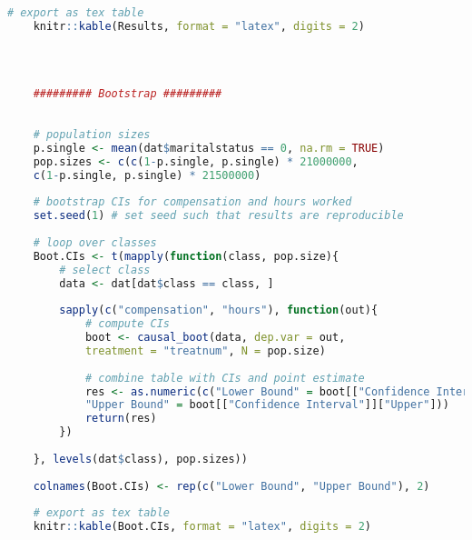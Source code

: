 \documentclass[aodsor,preprint]{imsart}
\numberwithin{equation}{section}
\theoremstyle{plain}
\begin{document}
\begin{lstlisting}[language=R, basicstyle=\tiny]
	# export as tex table
	knitr::kable(Results, format = "latex", digits = 2)
	
	
	
	
	######### Bootstrap #########
	
	
	# population sizes
	p.single <- mean(dat$maritalstatus == 0, na.rm = TRUE)
	pop.sizes <- c(c(1-p.single, p.single) * 21000000,
	c(1-p.single, p.single) * 21500000)
	
	# bootstrap CIs for compensation and hours worked
	set.seed(1) # set seed such that results are reproducible
	
	# loop over classes
	Boot.CIs <- t(mapply(function(class, pop.size){
		# select class
		data <- dat[dat$class == class, ]
		
		sapply(c("compensation", "hours"), function(out){
			# compute CIs
			boot <- causal_boot(data, dep.var = out,
			treatment = "treatnum", N = pop.size)
			
			# combine table with CIs and point estimate
			res <- as.numeric(c("Lower Bound" = boot[["Confidence Interval"]]["Lower"],
			"Upper Bound" = boot[["Confidence Interval"]]["Upper"]))
			return(res)
		})
		
	}, levels(dat$class), pop.sizes))
	
	colnames(Boot.CIs) <- rep(c("Lower Bound", "Upper Bound"), 2)
	
	# export as tex table
	knitr::kable(Boot.CIs, format = "latex", digits = 2)
	
	
\end{lstlisting}


\newpage

{}
\end{document}
